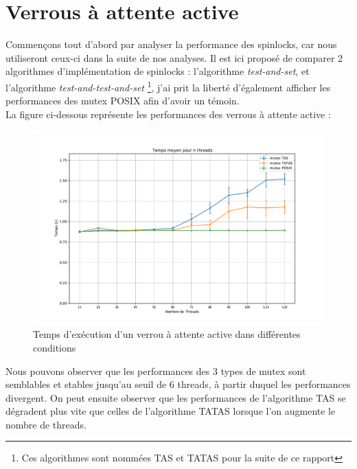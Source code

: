 \section{Verrous à attente active}

Commençons tout d'abord par analyser la performance des spinlocks, car nous utiliseront ceux-ci dans la suite de nos analyses. Il est ici proposé de comparer
2 algorithmes d'implémentation de spinlocks : l'algorithme \textit{test-and-set}, et l'algorithme \textit{test-and-test-and-set} \footnote{Ces algorithmes sont nommées TAS et TATAS pour la suite de ce rapport}, j'ai prit la liberté d'également afficher les performances des mutex POSIX afin d'avoir un témoin. \\

La figure ci-dessous représente les performances des verrous à attente active :
\begin{figure}[h!]
    \centering
    \includegraphics[scale=0.4]{img/spinlock.pdf}
    \caption{Temps d'exécution d'un verrou à attente active dans différentes conditions}
    \label{pic:spinlock}
\end{figure}

\noindent Nous pouvons observer que les performances des 3 types de mutex sont semblables et stables jusqu'au seuil de 6 threads, à partir duquel les performances divergent.
On peut ensuite observer que les performances de l'algorithme TAS se dégradent plus vite que celles de l'algorithme TATAS lorsque l'on augmente le nombre de threads. 

